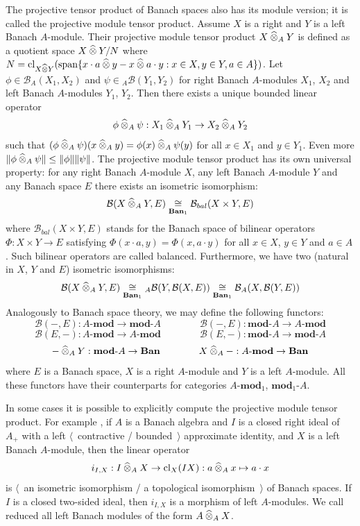 The projective tensor product of Banach spaces also has its module version; it is
called the projective module tensor product. Assume $X$ is a right and $Y$ is a
left Banach $A$-module. Their projective module tensor product
$X\mathbin{\widehat{\otimes}}_{A}Y$ is defined as a quotient space $X\mathbin{\widehat{\otimes}} Y / N$ where
$N
=\operatorname{cl}_{X\mathbin{\widehat{\otimes}} Y}(\operatorname{span} \{
  x\cdot a\mathbin{\widehat{\otimes}} y-x\mathbin{\widehat{\otimes}} a\cdot y
  :x\in X,y\in Y,a\in A
 \})$. 
Let $\phi\in\mathcal{B}_A(X_1,X_2)$ and $\psi\in{}_A\mathcal{B}(Y_1,Y_2)$ 
for right Banach $A$-modules $X_1$, $X_2$ and left 
Banach $A$-modules $Y_1$, $Y_2$. Then there exists a unique bounded 
linear operator 
\[
\phi\mathbin{\widehat{\otimes}}_{A} \psi:X_1\mathbin{\widehat{\otimes}}_{A} Y_1\to X_2\mathbin{\widehat{\otimes}}_{A} Y_2
\] 
such that
$(\phi\mathbin{\widehat{\otimes}}_{A} \psi)(x\mathbin{\widehat{\otimes}}_{A} y)=\phi(x)\mathbin{\widehat{\otimes}}_{A} \psi(y)$
for all $x\in X_1$ and $y\in Y_1$. Even more 
$\lVert \phi\mathbin{\widehat{\otimes}}_{A} \psi\rVert\leq\lVert \phi\rVert\lVert \psi\rVert$. 
The projective module tensor product has its own universal property: for any
right Banach $A$-module $X$, any left Banach $A$-module $Y$ and any Banach space
$E$ there exists an isometric isomorphism:
\[
\mathcal{B}(X\mathbin{\widehat{\otimes}}_{A}Y,E)
\mathrel{\mathop{\cong}\limits_{\mathbf{Ban}_1}}
\mathcal{B}_{bal}(X\times Y, E)
\]
where $\mathcal{B}_{bal}(X\times Y, E)$ stands for the Banach space of bilinear
operators $\Phi:X\times Y\to E$ satisfying $\Phi(x\cdot a,y)=\Phi(x,a\cdot y)$
for all $x\in X$, $y\in Y$ and $a\in A$. Such bilinear operators are called
balanced. Furthermore, we have two (natural in $X$, $Y$ and $E$) isometric
isomorphisms:
\[
\mathcal{B}(X\mathbin{\widehat{\otimes}}_{A}Y,E)
\mathrel{\mathop{\cong}\limits_{\mathbf{Ban}_1}}
{}_A\mathcal{B}(Y,\mathcal{B}(X,E))
\mathrel{\mathop{\cong}\limits_{\mathbf{Ban}_1}}
\mathcal{B}_A(X,\mathcal{B}(Y,E))
\]
Analogously to Banach space theory, we may define the following functors:
\[
\mathcal{B}(-,E):A\text{-}\mathbf{mod}\to \mathbf{mod}\text{-}A
\qquad\qquad
\mathcal{B}(-,E):\mathbf{mod}\text{-}A\to A\text{-}\mathbf{mod}
\]
\[
\mathcal{B}(E,-):A\text{-}\mathbf{mod}\to A\text{-}\mathbf{mod}
\qquad\qquad
\mathcal{B}(E,-):\mathbf{mod}\text{-}A\to \mathbf{mod}\text{-}A
\]
\[
-\mathbin{\widehat{\otimes}}_{A} Y:\mathbf{mod}\text{-}A\to\mathbf{Ban}
\qquad\qquad
X\mathbin{\widehat{\otimes}}_{A} -:A\text{-}\mathbf{mod}\to\mathbf{Ban}
\]
where $E$ is a Banach space, $X$ is a right $A$-module and $Y$ is a left
$A$-module. All these functors have their counterparts for categories
$A\text{-}\mathbf{mod}_1$, $\mathbf{mod}_1\text{-}A$. 

In some cases it is possible to explicitly compute the projective module tensor
product. For example \cite[proposition 6.3.24]{HelBanLocConvAlg}, if $A$ is a 
Banach algebra and $I$ is a closed right ideal of $A_+$ with 
a left $\langle$~contractive / bounded~$\rangle$ approximate identity, and $X$ is 
a left Banach $A$-module, then the linear operator 
\[
i_{I,X}
:I\mathbin{\widehat{\otimes}}_{A}X \to \operatorname{cl}_X(IX)
:a\mathbin{\widehat{\otimes}}_{A} x\mapsto a\cdot x
\]
is $\langle$~an isometric isomorphism / a topological isomorphism~$\rangle$ of
Banach spaces. If $I$ is a closed two-sided ideal, then $i_{I,X}$ is a morphism of left
$A$-modules. We call reduced all left Banach modules of the form
$A\mathbin{\widehat{\otimes}}_{A}X$. 

